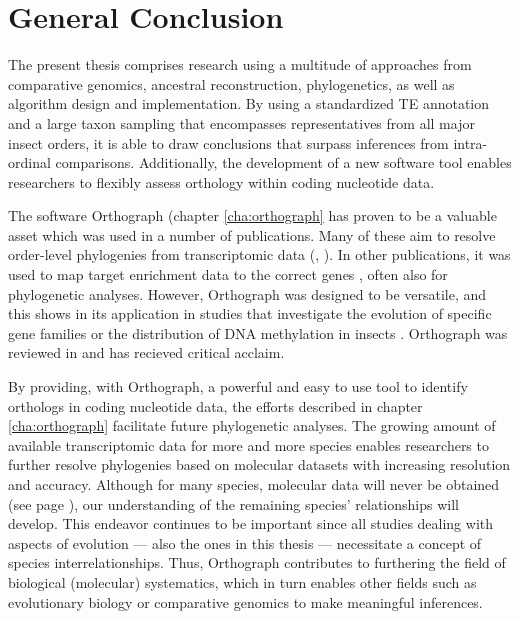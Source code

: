 \chapter{General Conclusion}
\label{conclusion}

The present thesis comprises research using a multitude of approaches
from comparative genomics, ancestral reconstruction, phylogenetics, as
well as algorithm design and implementation. By using a standardized TE
annotation and a large taxon sampling that encompasses representatives
from all major insect orders, it is able to draw conclusions that
surpass inferences from intra-ordinal comparisons.  Additionally, the
development of a new software tool enables researchers to flexibly
assess orthology within coding nucleotide data.

The software Orthograph (chapter \ref{cha:orthograph} has proven to be a
valuable asset which was used in a number of publications. Many of these
aim to resolve order-level phylogenies from transcriptomic data (\eg,
\citet{Bank2017, Peters2017, Kutty2018, Gillung2018, Johnson2018,
Simon2018}). In other publications, it was used to map target enrichment
data to the correct genes \citep{Mayer2016, Sann2018, Shin2018}, often
also for phylogenetic analyses. However, Orthograph was designed to be
versatile, and this shows in its application in studies that investigate
the evolution of specific gene families \citep{Pauli2016, Dowling2017}
or the distribution of DNA methylation in insects
\citep{Provataris2018}.  Orthograph was reviewed in \citet{Nichio2017}
and has recieved critical acclaim.

By providing, with Orthograph, a powerful and easy to use tool to
identify orthologs in coding nucleotide data, the efforts described in
chapter \ref{cha:orthograph} facilitate future phylogenetic analyses.
The growing amount of available transcriptomic data for more and more
species enables researchers to further resolve phylogenies based on
molecular datasets with increasing resolution and accuracy. Although for
many species, molecular data will never be obtained (see page
\pageref{mass-extinction}), our understanding of the remaining species'
relationships will develop. This endeavor continues to be important
since all studies dealing with aspects of evolution --- also the ones in
this thesis --- necessitate a concept of species interrelationships.
Thus, Orthograph contributes to furthering the field of biological
(molecular) systematics, which in turn enables other fields such as
evolutionary biology or comparative genomics to make meaningful
inferences.

